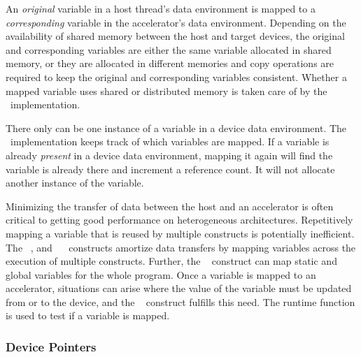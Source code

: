 An \emph{original} variable in a host thread's data environment is mapped to a
\emph{corresponding} variable in the accelerator's data environment.
Depending on the availability of shared memory between the host and target
devices, the original and corresponding variables are either the same variable
allocated in shared memory, or they are allocated in different memories and
copy operations are required to keep the original and corresponding variables
consistent. Whether a mapped variable uses shared or distributed memory is 
taken care of by the \OMP\ implementation.

There only can be one instance of a variable in a device data environment.  The
\OMP\ implementation keeps track of which variables are mapped.  If a variable
is already \emph{present} in a device data environment, mapping it again will
find the variable is already there and increment a reference count.  It
will not allocate another instance of the variable.

Minimizing the transfer of data between the host and an accelerator is often
critical to getting good performance on heterogeneous architectures.
Repetitively mapping a variable that is reused by multiple 
constructs is potentially inefficient.  The ~,
 and ~~ constructs amortize data
transfers by mapping variables across the execution of multiple 
constructs.  Further, the ~ construct can map static and
global variables for the whole program.  Once a variable is mapped to an
accelerator, situations can arise where the value of the variable must be
updated from or to the device, and the ~
construct fulfills this need.  The  runtime
function is used to test if a variable is mapped.  

\subsubsection{Device Pointers}
\label{ssec:06.device-pointers}

